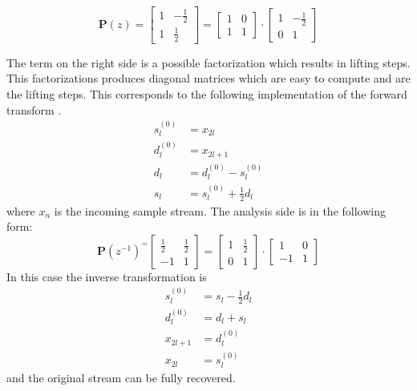\begin{refsection}
\begin{equation*}
\bm P(z) =
\begin{bmatrix}
1 & -\frac{1}{2} \\
1 & \frac{1}{2}
\end{bmatrix}
 = 
 \begin{bmatrix}
 1 & 0 \\
 1 & 1
 \end{bmatrix}
 \cdot
 \begin{bmatrix}
 1 & -\frac{1}{2} \\
 0 & 1
 \end{bmatrix}
\end{equation*}

The term on the right side is a possible factorization which results in lifting steps.
This factorizations produces diagonal matrices which are easy to compute and are the lifting steps.
This corresponds to the following implementation of the forward transform \cite{fpga:Daubechies1998}.
\begin{equation}\label{fpga:equation:haar}
	\begin{aligned}
	s_l^{(0)} &= x_{2l} \\
	d_l^{(0)} &= x_{2l+1} \\ 
	d_l &= d_l^{(0)} - s_l^{(0)} \\
	s_l &= s_l^{(0)} + \frac{1}{2}d_l
	\end{aligned}
\end{equation}
where $x_{n}$ is the incoming sample stream.
The analysis side is in the following form:
\begin{equation*}
\bm P(z^{-1})^ =
\begin{bmatrix}
\frac{1}{2} & \frac{1}{2} \\
-1 & 1
\end{bmatrix}
= 
\begin{bmatrix}
1 & \frac{1}{2} \\
0 & 1
\end{bmatrix}
\cdot
\begin{bmatrix}
1 & 0 \\
-1 & 1
\end{bmatrix}
\end{equation*}
In this case the inverse transformation is 
\begin{equation}\label{fpga:equation:inv_haar}
\begin{aligned}
s_l^{(0)} &= s_l - \frac{1}{2}d_l \\
d_l^{(0)} &= d_l + s_l \\ 
x_{2l+1}& =d_l^{(0)} \\
x_{2l} &= s_l^{(0)}
\end{aligned}
\end{equation}
and the original stream can be fully recovered.


\end{refsection}
